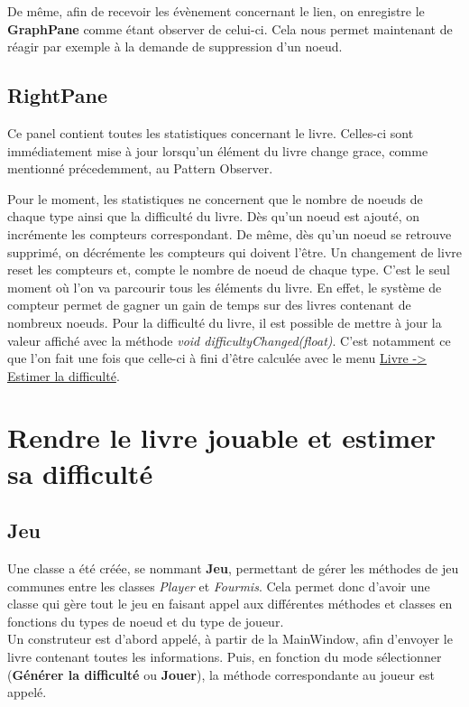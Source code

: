 				De même, afin de recevoir les évènement concernant le lien, on enregistre le \textbf{GraphPane} comme étant observer de celui-ci. Cela nous permet maintenant de réagir par exemple à la demande de suppression d'un noeud.

		\subsection{RightPane}

			Ce panel contient toutes les statistiques concernant le livre. Celles-ci sont immédiatement mise à jour lorsqu'un élément du livre change grace, comme mentionné précedemment, au Pattern Observer.

			Pour le moment, les statistiques ne concernent que le nombre de noeuds de chaque type ainsi que la difficulté du livre. Dès qu'un noeud est ajouté, on incrémente les compteurs correspondant. De même, dès qu'un noeud se retrouve supprimé, on décrémente les compteurs qui doivent l'être. Un changement de livre reset les compteurs et, compte le nombre de noeud de chaque type. C'est le seul moment où l'on va parcourir tous les éléments du livre. En effet, le système de compteur permet de gagner un gain de temps sur des livres contenant de nombreux noeuds. Pour la difficulté du livre, il est possible de mettre à jour la valeur affiché avec la méthode \textit{void difficultyChanged(float)}. C'est notamment ce que l'on fait une fois que celle-ci à fini d'être calculée avec le menu \underline{Livre -> Estimer la difficulté}.

	\section{Rendre le livre jouable et estimer sa difficulté}
		\label{sec:Jeu}

		\subsection{Jeu}

			Une classe a été créée, se nommant \textbf{Jeu}, permettant de gérer les méthodes de jeu communes entre les classes \textit{Player} et \textit{Fourmis}. Cela permet donc d'avoir une classe qui gère tout le jeu en faisant appel aux différentes méthodes et classes en fonctions du types de noeud et du type de joueur. \\
			Un construteur est d'abord appelé, à partir de la MainWindow, afin d'envoyer le livre contenant toutes les informations. Puis, en fonction du mode sélectionner (\textbf{Générer la difficulté} ou \textbf{Jouer}), la méthode correspondante au joueur est appelé.\\

